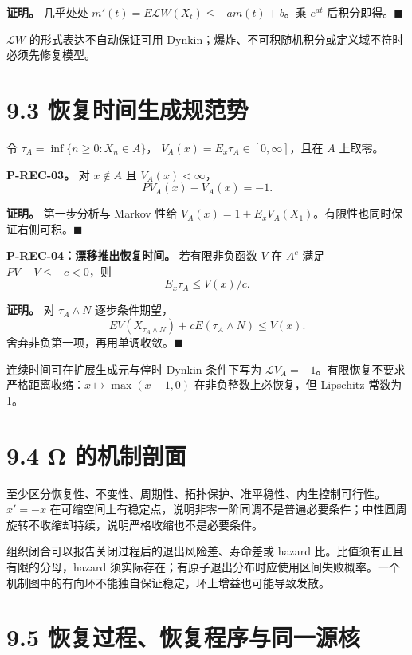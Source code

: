 \documentclass[
  11pt,
  oneside]{book}
\begin{document}
\textbf{证明。} 几乎处处 \(m'(t)=E\mathcal LW(X_t)\le-am(t)+b\)。乘 \(e^{at}\) 后积分即得。\(\blacksquare\)

\(\mathcal LW\) 的形式表达不自动保证可用 Dynkin；爆炸、不可积随机积分或定义域不符时必须先修复模型。

\section{9.3 恢复时间生成规范势}\label{ux6062ux590dux65f6ux95f4ux751fux6210ux89c4ux8303ux52bf}

令 \(\tau_A=\inf\{n\ge0:X_n\in A\}\)， \(V_A(x)=E_x\tau_A\in[0,\infty]\)，且在 \(A\) 上取零。

\hypertarget{p-rec-03}{}\label{p-rec-03}

\textbf{P-REC-03。} 对 \(x\notin A\) 且 \(V_A(x)<\infty\)， \[PV_A(x)-V_A(x)=-1.\]

\textbf{证明。} 第一步分析与 Markov 性给 \(V_A(x)=1+E_xV_A(X_1)\)。有限性也同时保证右侧可积。\(\blacksquare\)

\hypertarget{p-rec-04}{}\label{p-rec-04}

\textbf{P-REC-04：漂移推出恢复时间。} 若有限非负函数 \(V\) 在 \(A^c\) 满足 \(PV-V\le-c<0\)，则 \[E_x\tau_A\le V(x)/c.\]

\textbf{证明。} 对 \(\tau_A\wedge N\) 逐步条件期望， \[E V(X_{\tau_A\wedge N})+cE(\tau_A\wedge N)\le V(x).\] 舍弃非负第一项，再用单调收敛。\(\blacksquare\)

连续时间可在扩展生成元与停时 Dynkin 条件下写为 \(\mathcal LV_A=-1\)。有限恢复不要求严格距离收缩：\(x\mapsto\max(x-1,0)\) 在非负整数上必恢复，但 Lipschitz 常数为 1。

\section{9.4 Ω 的机制剖面}\label{ux3c9-ux7684ux673aux5236ux5256ux9762}

至少区分恢复性、不变性、周期性、拓扑保护、准平稳性、内生控制可行性。\(x'=-x\) 在可缩空间上有稳定点，说明非零一阶同调不是普遍必要条件；中性圆周旋转不收缩却持续，说明严格收缩也不是必要条件。

组织闭合可以报告关闭过程后的退出风险差、寿命差或 hazard 比。比值须有正且有限的分母，hazard 须实际存在；有原子退出分布时应使用区间失败概率。一个机制图中的有向环不能独自保证稳定，环上增益也可能导致发散。

\section{9.5 恢复过程、恢复程序与同一源核}\label{ux6062ux590dux8fc7ux7a0bux6062ux590dux7a0bux5e8fux4e0eux540cux4e00ux6e90ux6838}
\end{document}
